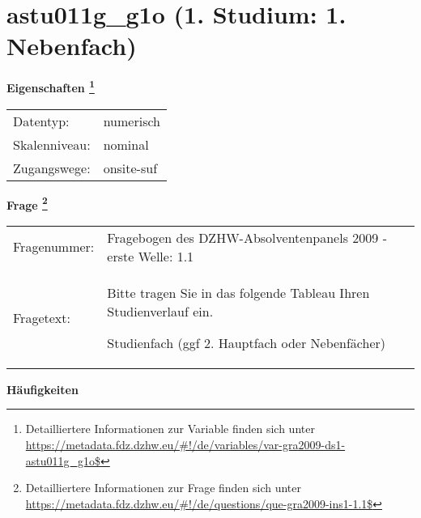 
    \setcounter{footnote}{0}

    \vspace*{-1.8cm}
	\section{astu011g\_g1o (1. Studium: 1. Nebenfach)}
	\label{section:astu011g_g1o}



    \vspace*{0.5cm}
    \noindent\textbf{Eigenschaften
	\footnote{Detailliertere Informationen zur Variable finden sich unter
		\url{https://metadata.fdz.dzhw.eu/\#!/de/variables/var-gra2009-ds1-astu011g_g1o$}}}\\
	\begin{tabularx}{\hsize}{@{}lX}
	Datentyp: & numerisch \\
	Skalenniveau: & nominal \\
	Zugangswege: &
	  onsite-suf
 \\
    \end{tabularx}



				\vspace*{0.5cm}
                \noindent\textbf{Frage
	                \footnote{Detailliertere Informationen zur Frage finden sich unter
		              \url{https://metadata.fdz.dzhw.eu/\#!/de/questions/que-gra2009-ins1-1.1$}}}\\
				\begin{tabularx}{\hsize}{@{}lX}
					Fragenummer: &
					  Fragebogen des DZHW-Absolventenpanels 2009 - erste Welle:
					  1.1
 \\
					Fragetext: & Bitte tragen Sie in das folgende Tableau Ihren Studienverlauf ein.\par  Studienfach (ggf 2. Hauptfach oder Nebenfächer) \\
				\end{tabularx}





        		\vspace*{0.5cm}
                \noindent\textbf{Häufigkeiten}

